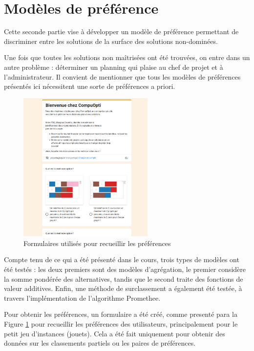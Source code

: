 \documentclass[12pt, a4paper, french, version=last, parskip=half, titlepage]{scrartcl}
\begin{document}

\section{Modèles de préférence}

Cette seconde partie vise à développer un modèle de préférence permettant de discriminer entre les solutions de la surface des solutions non-dominées. 

Une fois que toutes les solutions non maîtrisées ont été trouvées, on entre dans un autre problème : déterminer un planning qui plaise au chef de projet et à l'administrateur. Il convient de mentionner que tous les modèles de préférences présentés ici nécessitent une sorte de préférences a priori.


\begin{figure}[H]
\centering
\includegraphics[width=0.6\textwidth]{images/forms.png}
\caption{Formulaires utilisés pour recueillir les préférences}
\label{fig:forms}
\end{figure}    

Compte tenu de ce qui a été présenté dans le cours, trois types de modèles ont été testés : les deux premiers sont des modèles d'agrégation, le premier considère la somme pondérée des alternatives, tandis que le second traite des fonctions de valeur additives. Enfin, une méthode de surclassement a également été testée, à travers l'implémentation de l'algorithme Promethee.

Pour obtenir les préférences, un formulaire a été créé, comme presenté para la Figure \ref{fig:forms} pour recueillir les préférences des utilisateurs, principalement pour le petit jeu d'instances (jouets). Cela a été fait uniquement pour obtenir des données sur les classements partiels ou les paires de préférences.
\end{document}
